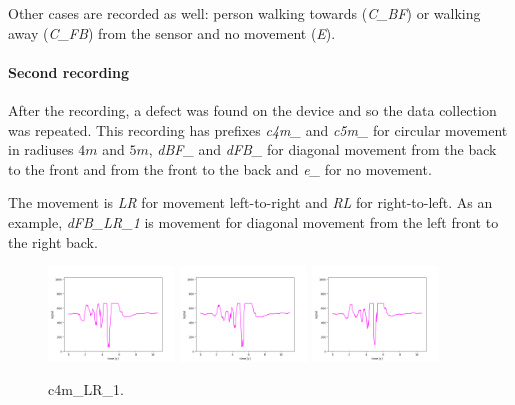 Other cases are recorded as well: person walking towards ({\it C\_BF})
or walking away ({\it C\_FB}) from the sensor and no movement ({\it E}). 

\paragraph{Second recording}
After the recording, a defect was found on the device and so the data
collection was repeated. This recording has prefixes {\it c4m\_} and {\it c5m\_}
for circular movement in radiuses $4m$ and $5m$, {\it dBF\_} and {\it dFB\_}
for diagonal movement from the back to the front and from the front
to the back and {\it e\_} for no movement.

The movement is {\it LR} for movement left-to-right and {\it RL}
for right-to-left. As an example, {\it dFB\_LR\_1} is movement
for diagonal movement from the left front to the right back.

\begin{figure}[!ht]
\begin{center}
\includegraphics[width=0.3\textwidth]{../data/c4m_LR_1/c4m_LR_1_1.png}
\includegraphics[width=0.3\textwidth]{../data/c4m_LR_1/c4m_LR_1_2.png}
\includegraphics[width=0.3\textwidth]{../data/c4m_LR_1/c4m_LR_1_3.png}
\caption{c4m\_LR\_1.\label{fig:c4m_LR_1}}
\end{center}
\end{figure}

